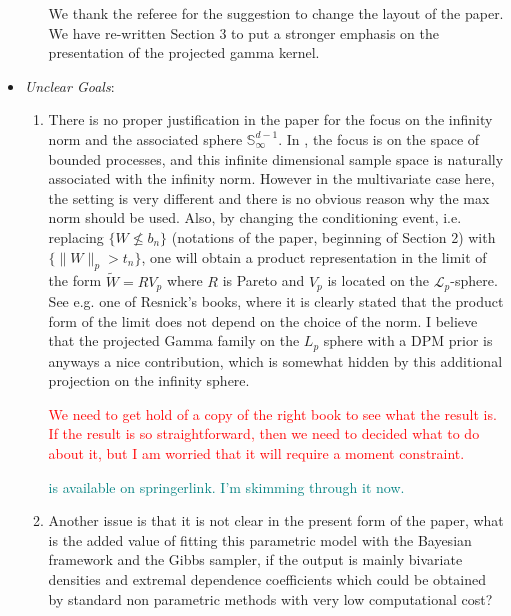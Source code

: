 \documentclass[10pt]{article}
\newcommand{\comment}[1]{\textcolor{teal}{#1}}
\newcommand{\bruno}[1]{\textcolor{red}{#1}}
\begin{document}
\begin{itemize}
\begin{enumerate}
            We thank the referee for the suggestion to change the layout of the paper. We have
            re-written Section 3 to put a stronger emphasis on the presentation of the
            projected gamma kernel.
            
        \end{enumerate}

    \item \emph{Unclear Goals}: 
    \begin{enumerate}
        \item There is no proper justification in the paper for the focus on the infinity norm 
        and the associated sphere $\mathbb{S}_{\infty}^{d-1}$. In \cite{ferreira2014}, the focus
        is on the space of bounded processes, and this infinite dimensional sample space is 
        naturally associated with the infinity norm. However in the multivariate case here, the 
        setting is very different and there is no obvious reason why the max norm should be used. 
        Also, by changing the conditioning event, i.e. replacing $\lbrace W \not\leq b_{n}\rbrace$
        (notations of the paper, beginning of Section 2) with 
        $\lbrace \lVert W\rVert_p > t_n\rbrace$, one will obtain a product representation in the 
        limit of the form $\tilde{W} = RV_p$ where $R$ is Pareto and $V_p$ is located on the 
        $\mathcal{L}_p$-sphere. See e.g. one of Resnick’s books, where it is clearly stated that 
        the product form of the limit does not depend on the choice of the norm. I believe that 
        the projected Gamma family on the $L_p$ sphere with a DPM prior is anyways a nice 
        contribution, which is somewhat hidden by this additional projection on the infinity sphere.

        \bruno{We need to get hold of a copy of the right book to see what the result is. If the result 
        is so straightforward, then we need to decided what to do about it, but I am worried that
        it will require a moment constraint.}

        \comment{\cite{resnick2008extreme} is available on springerlink.  I'm skimming through it now.}
        
        \item Another issue is that it is not clear in the present form of the paper, what is the
        added value of fitting this parametric model with the Bayesian framework and the Gibbs 
        sampler, if the output is mainly bivariate densities and extremal dependence coefficients 
        which could be obtained by standard non parametric methods with very low computational cost?


\end{enumerate}
\end{itemize}
\end{document}
